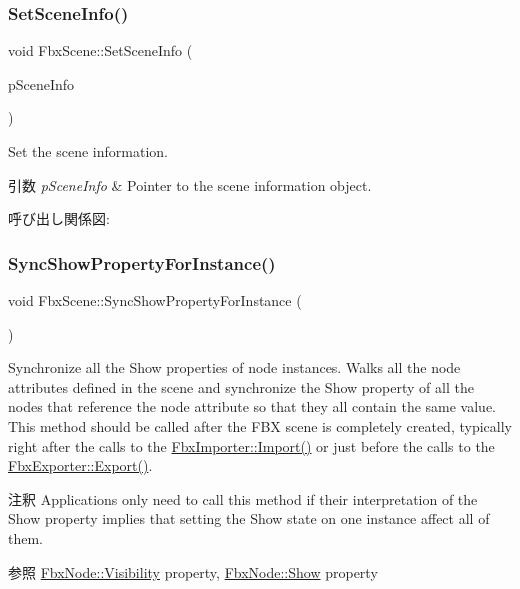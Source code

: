 \subsubsection{\texorpdfstring{Set\+Scene\+Info()}{SetSceneInfo()}}
{\footnotesize\ttfamily void Fbx\+Scene\+::\+Set\+Scene\+Info (\begin{DoxyParamCaption}\item[{\hyperlink{class_fbx_document_info}{Fbx\+Document\+Info} $\ast$}]{p\+Scene\+Info }\end{DoxyParamCaption})}

Set the scene information. 
\begin{DoxyParams}{引数}
{\em p\+Scene\+Info} & Pointer to the scene information object. \\
\hline
\end{DoxyParams}
呼び出し関係図\+:
\mbox{\label{class_fbx_scene_a940444136913f6e50f687ff0807c93e5}} 
\subsubsection{\texorpdfstring{Sync\+Show\+Property\+For\+Instance()}{SyncShowPropertyForInstance()}}
{\footnotesize\ttfamily void Fbx\+Scene\+::\+Sync\+Show\+Property\+For\+Instance (\begin{DoxyParamCaption}{ }\end{DoxyParamCaption})}

Synchronize all the Show properties of node instances. Walks all the node attributes defined in the scene and synchronize the Show property of all the nodes that reference the node attribute so that they all contain the same value. This method should be called after the F\+BX scene is completely created, typically right after the calls to the \hyperlink{class_fbx_importer_a1c5a7f9ee8a6952c1e039065cfa09659}{Fbx\+Importer\+::\+Import()} or just before the calls to the \hyperlink{class_fbx_exporter_a8a92372cf76fe3486a798c87973cc791}{Fbx\+Exporter\+::\+Export()}. \begin{DoxyRemark}{注釈}
Applications only need to call this method if their interpretation of the Show property implies that setting the Show state on one instance affect all of them. 
\end{DoxyRemark}
\begin{DoxySeeAlso}{参照}
\hyperlink{class_fbx_node_a9f02f0a70b81c1a656137def3e34edb7}{Fbx\+Node\+::\+Visibility} property, \hyperlink{class_fbx_node_a685ccf0b6e1bc5070c28d9e7a8823c74}{Fbx\+Node\+::\+Show} property 
\end{DoxySeeAlso}
\mbox{\label{class_fbx_scene_a68b89374967020ed469645de47eb4507}} 
